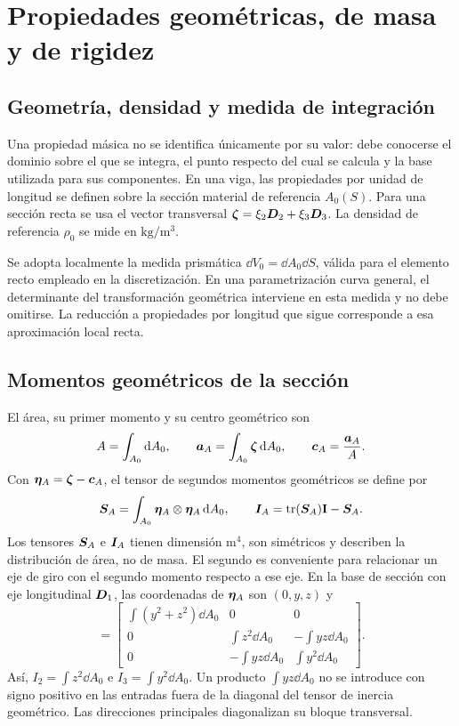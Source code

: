 \chapter{Propiedades geométricas, de masa y de rigidez}
\label{ch:propiedades}
\section{Geometría, densidad y medida de integración}
Una propiedad másica no se identifica únicamente por su valor: debe conocerse el dominio sobre el que se integra, el punto respecto del cual se calcula y la base utilizada para sus componentes. En una viga, las propiedades por unidad de longitud se definen sobre la sección material de referencia $A_0(S)$. Para una sección recta se usa el vector transversal $\bm{\zeta}=\xi_2\bm{D}_2+\xi_3\bm{D}_3$. La densidad de referencia $\rho_0$ se mide en $\mathrm{kg/m^3}$.

Se adopta localmente la medida prismática $\dd V_0=\dd A_0\dd S$, válida para el elemento recto empleado en la discretización. En una parametrización curva general, el determinante del transformación geométrica interviene en esta medida y no debe omitirse. La reducción a propiedades por longitud que sigue corresponde a esa aproximación local recta.

\section{Momentos geométricos de la sección}
El área, su primer momento y su centro geométrico son
\begin{equation}
 A=\int_{A_0}\mathrm d A_0,\qquad
 \bm{a}_A=\int_{A_0}\bm{\zeta}\,\mathrm d A_0,\qquad
 \bm{c}_A=\frac{\bm{a}_A}{A}.
\end{equation}
Con $\bm{\eta}_A=\bm{\zeta}-\bm{c}_A$, el tensor de segundos momentos geométricos se define por
\begin{equation}
 \boldsymbol{S}_A=\int_{A_0}\bm{\eta}_A\otimes\bm{\eta}_A\,\mathrm d A_0,
 \qquad
 \boldsymbol{I}_A=\operatorname{tr}(\boldsymbol{S}_A)\mathbf I-\boldsymbol{S}_A.
 \label{eq:area_tensor}
\end{equation}
Los tensores $\boldsymbol{S}_A$ e $\boldsymbol{I}_A$ tienen dimensión $\mathrm{m^4}$, son simétricos y describen la distribución de área, no de masa. El segundo es conveniente para relacionar un eje de giro con el segundo momento respecto a ese eje. En la base de sección con eje longitudinal $\bm{D}_1$, las coordenadas de $\bm{\eta}_A$ son $(0,y,z)$ y
\begin{equation}
 [\ten I_A]=
 \begin{bmatrix}
 \int(y^2+z^2)\dd A_0&0&0\\
 0&\int z^2\dd A_0&-\int yz\dd A_0\\
 0&-\int yz\dd A_0&\int y^2\dd A_0
 \end{bmatrix}.
\end{equation}
Así, $I_2=\int z^2\dd A_0$ e $I_3=\int y^2\dd A_0$. Un producto $\int yz\dd A_0$ no se introduce con signo positivo en las entradas fuera de la diagonal del tensor de inercia geométrico. Las direcciones principales diagonalizan su bloque transversal.

